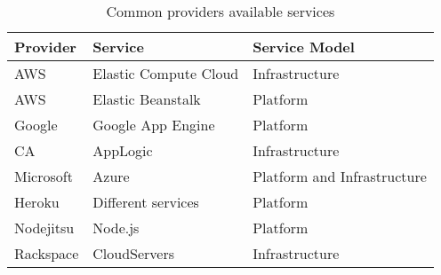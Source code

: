 \begin{table}
  \begin{center}
    \begin{tabular}{ | l | l | l | }
      \hline
      \textbf{Provider} & \textbf{Service} & \textbf{Service Model} \\ \hline
      AWS & Elastic Compute Cloud & Infrastructure \\ \hline
      AWS & Elastic Beanstalk & Platform \\ \hline
      Google & Google App Engine & Platform \\ \hline
      CA & AppLogic & Infrastructure \\ \hline
      Microsoft & Azure & Platform and Infrastructure \\ \hline
      Heroku & Different services & Platform \\ \hline
      Nodejitsu & Node.js & Platform \\ \hline
      Rackspace & CloudServers & Infrastructure \\ \hline
    \end{tabular}
  \end{center}
  \caption{Common providers available services}
  \label{table:providerservices}
\end{table}

